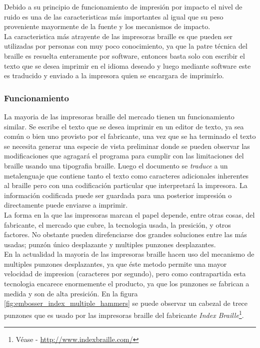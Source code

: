 Debido a su principio de funcionamiento de impresi\'on por impacto el nivel de
ruido es una de las caracteristicas m\'as importantes al igual que su peso
proveniente mayormente de la fuente y los mecanismos de impacto.\\

La caracteristica m\'as atrayente de las impresoras braille es que pueden ser
utilizadas por personas con muy poco conocimiento, ya que la patre t\'ecnica
del braille es resuelta enteramente por software, entonces basta solo con
escribir el texto que se desea imprimir en el idioma deseado y luego mediante
software este es traducido y enviado a la impresora quien se encargara de
imprimirlo.

\subsubsection{Funcionamiento}
%
La mayoria de las impresoras braille del mercado tienen un funcionamiento
similar. Se escribe el texto que se desea imprimir en un editor de texto, ya
sea com\'un o bien uno provisto por el fabricante, una vez que se ha terminado
el texto se necesita generar una especie de vista preliminar donde se pueden
observar las modificaciones que agragar\'a el programa para cumplir con las
limitaciones del braille usando una tipografia braille. Luego el documento se
\emph{traduce} a un metalenguaje que contiene tanto el texto como caracteres
adicionales inherentes al braille pero con una codificaci\'on particular que
interpretar\'a la impresora. La informaci\'on codificada puede ser guardada
para una posterior impresi\'on o directamente puede enviarse a imprimir.\\

La forma en la que las impresoras marcan el papel depende, entre otras cosas,
del fabricante, el mercado que cubre, la tecnologia usada, la presici\'on, y
otros factores.  
No obstante pueden direfenciarse dos grandes soluciones entre las m\'as
usadas; punz\'on \'unico desplazante y multiples punzones desplazantes.\\

En la actualidad la mayoria de las impresoras braille hacen uso del mecanismo
de multiples punzones desplazantes, ya que \'este metodo permite una mayor
velocidad de impresion (caracteres por segundo), pero como contrapartida esta
tecnologia encarece enormemente el producto, ya que los punzones se fabrican a
medida y son de alta presici\'on. En la figura
\ref{fig:embosser_index_multiple_hammers} se puede observar un cabezal de trece
punzones que es usado por las impresoras braille del fabricante \emph{Index
Braille}\footnote{V\'ease - \url{http://www.indexbraille.com/}}.

